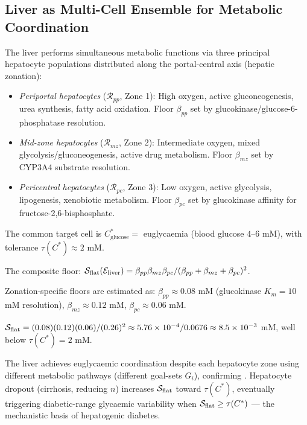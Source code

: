 \subsection{Liver as Multi-Cell Ensemble for Metabolic Coordination}

\begin{example}
\label{ex:liver-ensemble}
The liver performs simultaneous metabolic functions via three principal
hepatocyte populations distributed along the portal-central axis (hepatic
zonation):

\begin{itemize}[leftmargin=2em]
  \item \textit{Periportal hepatocytes} ($\mathcal{R}_{pp}$, Zone 1):
    High oxygen, active gluconeogenesis, urea synthesis, fatty acid oxidation.
    Floor $\beta_{pp}$ set by glucokinase/glucose-6-phosphatase resolution.
  \item \textit{Mid-zone hepatocytes} ($\mathcal{R}_{mz}$, Zone 2):
    Intermediate oxygen, mixed glycolysis/gluconeogenesis, active drug
    metabolism.  Floor $\beta_{mz}$ set by CYP3A4 substrate resolution.
  \item \textit{Pericentral hepatocytes} ($\mathcal{R}_{pc}$, Zone 3):
    Low oxygen, active glycolysis, lipogenesis, xenobiotic metabolism.
    Floor $\beta_{pc}$ set by glucokinase affinity for fructose-2,6-bisphosphate.
\end{itemize}

The common target cell is $C^*_{\mathrm{glucose}} =$ euglycaemia
(blood glucose $4$--$6$ mM), with tolerance $\tau(C^*) \approx 2$ mM.

The composite floor:
$\mathcal{S}_{\mathrm{flat}}(\mathcal{E}_{\mathrm{liver}}) =
\beta_{pp} \beta_{mz} \beta_{pc} / (\beta_{pp} + \beta_{mz} + \beta_{pc})^2$.

Zonation-specific floors are estimated as:
$\beta_{pp} \approx 0.08$ mM (glucokinase $K_m = 10$ mM resolution),
$\beta_{mz} \approx 0.12$ mM, $\beta_{pc} \approx 0.06$ mM.

$\mathcal{S}_{\mathrm{flat}} = (0.08)(0.12)(0.06) / (0.26)^2 \approx 5.76 \times 10^{-4}
/ 0.0676 \approx 8.5 \times 10^{-3}$ mM, well below $\tau(C^*) = 2$ mM.

The liver achieves euglycaemic coordination despite each hepatocyte zone
using different metabolic pathways (different goal-sets $G_i$), confirming
.  Hepatocyte dropout (cirrhosis, reducing
$n$) increases $\mathcal{S}_{\mathrm{flat}}$ toward $\tau(C^*)$, eventually triggering
diabetic-range glycaemic variability when $\mathcal{S}_{\mathrm{flat}} \geq \tau(C^*)$
— the mechanistic basis of hepatogenic diabetes.
\end{example}

